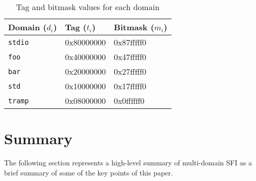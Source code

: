 \documentclass[12pt]{article}
\begin{document}
\begin{table}[H]
\centering
\begin{tabular}{@{}lll@{}}
\rowcolor[HTML]{EFEFEF} 
\textbf{Domain ($d_i$)} & \textbf{Tag ($t_i$)} & \textbf{Bitmask ($m_i$)} \\ \midrule
\texttt{stdio}          & 0x80000000           & 0x87fffff0               \\
\rowcolor[HTML]{EFEFEF} 
\texttt{foo}            & 0x40000000           & 0x47fffff0               \\
\texttt{bar}            & 0x20000000           & 0x27fffff0               \\
\rowcolor[HTML]{EFEFEF} 
\texttt{std}            & 0x10000000           & 0x17fffff0               \\
\texttt{tramp}          & 0x08000000           & 0x0ffffff0              
\end{tabular}

\caption{Tag and bitmask values for each domain}
\label{tbl:masks}
\end{table}

\section{Summary}

The following section represents a high-level summary of multi-domain SFI as a brief summary of some of the key points of this paper.
\end{document}
